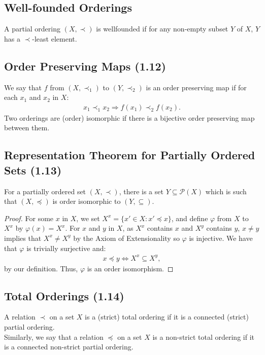 \subsection{Well-founded Orderings}

A partial ordering $(X, \prec)$ is wellfounded if for any non-empty subset
$Y$ of $X$, $Y$ has a $\prec$-least element.

\subsection{Order Preserving Maps (1.12)} \label{1.12}

We say that $f$ from $(X, \prec_1)$ to $(Y, \prec_2)$ is an order
preserving map if for each $x_1$ and $x_2$ in $X$: \begin{align*}
    x_1 \prec_1 x_2 \Longrightarrow f(x_1) \prec_2 f(x_2).
\end{align*} Two orderings are (order) isomorphic if there is
a bijective order preserving map between them.

\subsection{Representation Theorem for Partially Ordered Sets (1.13)} \label{1.13}

For a partially ordered set $(X, \prec)$, there is a set 
$Y \subseteq \mathcal{P}(X)$ which is such that $(X, \preceq)$
is order isomorphic to $(Y, \subseteq)$.

\begin{proof}
   For some $x$ in $X$, we set $X^x = \{x' \in X : x' \preceq x\}$,
   and define $\varphi$ from $X$ to $X^x$ by $\varphi(x) = X^x$. For $x$ and $y$
   in $X$, as $X^x$ contains $x$ and $X^y$ contains $y$, $x \neq y$ implies that 
   $X^x \neq X^y$ by the Axiom of Extensionality so $\varphi$ is injective. We
   have that $\varphi$ is trivially surjective and: \begin{align*}
       x \preceq y \Longleftrightarrow X^x \subseteq X^y,
   \end{align*} by our definition. Thus, $\varphi$ is an order isomorphism.
\end{proof}

\subsection{Total Orderings (1.14)} \label{1.14}

A relation $\prec$ on a set $X$ is a (strict) total ordering if it
is a connected (strict) partial ordering.
\\[\baselineskip]
Similarly, we say that a relation $\preceq$ on a set $X$ is a non-strict
total ordering if it is a connected non-strict partial ordering.

